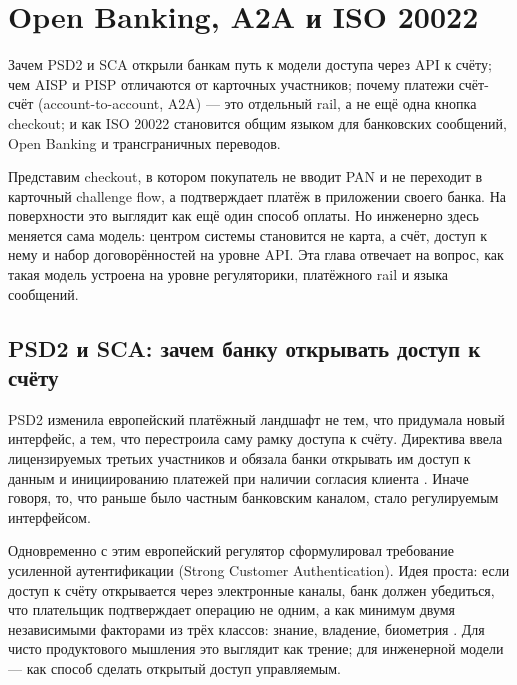 \chapter{Open Banking, A2A и ISO 20022}
\label{ch:open-banking}
\margintoc

\label{ch:global}
\margintoc


\begin{kaobox}[title=Что вы узнаете из этой главы]
  Зачем PSD2 и SCA открыли банкам путь к модели доступа через API
  к счёту; чем AISP и PISP отличаются от карточных участников;
  почему платежи счёт-счёт (account-to-account, A2A) — это
  отдельный rail, а не ещё одна кнопка checkout; и как ISO 20022
  становится общим языком для банковских сообщений, Open Banking
  и трансграничных переводов.
\end{kaobox}

Представим checkout, в котором покупатель не вводит PAN и не переходит
в карточный challenge flow, а подтверждает платёж в приложении своего
банка. На поверхности это выглядит как ещё один способ оплаты.
Но инженерно здесь меняется сама модель: центром системы становится
не карта, а счёт, доступ к нему и набор договорённостей на уровне API.
Эта глава отвечает на вопрос, как такая модель устроена на уровне
регуляторики, платёжного rail и языка сообщений.

\section{PSD2 и SCA: зачем банку открывать доступ к счёту}
\label{sec:psd2-sca}

PSD2 изменила европейский платёжный ландшафт не тем, что придумала новый интерфейс, а тем, что перестроила саму рамку
доступа к счёту. Директива ввела лицензируемых третьих участников и обязала банки открывать им доступ к данным и
инициированию платежей при наличии согласия клиента . Иначе говоря, то, что раньше было частным
банковским каналом, стало регулируемым интерфейсом.

Одновременно с этим европейский регулятор сформулировал требование
усиленной аутентификации (Strong Customer Authentication). Идея проста:
если доступ к счёту
открывается через электронные каналы, банк должен убедиться, что
плательщик подтверждает операцию не одним, а как минимум двумя
независимыми факторами из трёх классов: знание, владение,
биометрия . Для чисто продуктового мышления
это выглядит как трение; для инженерной модели — как способ
сделать открытый доступ управляемым.

